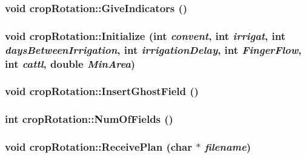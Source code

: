 \label{classcrop_rotation_a66d145fb7cd7bcf7e94298704b2702d7}
\hypertarget{classcrop_rotation_a487968cb6691bf0a24568bcb14078a50}{
\subsubsection[{GiveIndicators}]{\setlength{\rightskip}{0pt plus 5cm}void cropRotation::GiveIndicators ()}}
\label{classcrop_rotation_a487968cb6691bf0a24568bcb14078a50}
\hypertarget{classcrop_rotation_ab81177f47739f25b3c8e398659eb4f5a}{
\subsubsection[{Initialize}]{\setlength{\rightskip}{0pt plus 5cm}void cropRotation::Initialize (int {\em convent}, \/  int {\em irrigat}, \/  int {\em daysBetweenIrrigation}, \/  int {\em irrigationDelay}, \/  int {\em FingerFlow}, \/  int {\em cattl}, \/  double {\em MinArea})}}
\label{classcrop_rotation_ab81177f47739f25b3c8e398659eb4f5a}
\hypertarget{classcrop_rotation_a84652568c0c22bd83cf89d4971666d52}{
\subsubsection[{InsertGhostField}]{\setlength{\rightskip}{0pt plus 5cm}void cropRotation::InsertGhostField ()}}
\label{classcrop_rotation_a84652568c0c22bd83cf89d4971666d52}
\hypertarget{classcrop_rotation_a4f700ca77df824f98c51144e4e00de2f}{
\subsubsection[{NumOfFields}]{\setlength{\rightskip}{0pt plus 5cm}int cropRotation::NumOfFields ()}}
\label{classcrop_rotation_a4f700ca77df824f98c51144e4e00de2f}
\hypertarget{classcrop_rotation_a2789db66978b9330b357d5835d3b5b5e}{
\subsubsection[{ReceivePlan}]{\setlength{\rightskip}{0pt plus 5cm}void cropRotation::ReceivePlan (char $\ast$ {\em filename})}}
